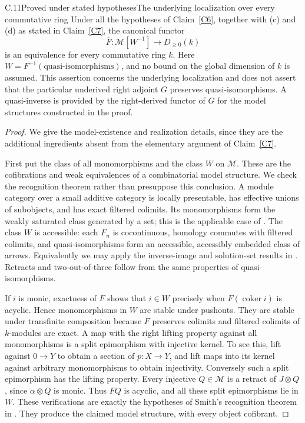 \begin{claim}{C.11}{Proved under stated hypotheses}{The underlying localization over every commutative ring}\label{C11}
Under all the hypotheses of Claim~\ref{C6}, together with (c) and (d) as stated in Claim~\ref{C7}, the canonical functor
\[
 \overline F:\mathcal M[W^{-1}]\longrightarrow D_{\geq0}(k)
\]
is an equivalence for every commutative ring $k$. Here $W=F^{-1}(\text{quasi-isomorphisms})$, and no bound on the global dimension of $k$ is assumed. This assertion concerns the underlying localization and does not assert that the particular underived right adjoint $G$ preserves quasi-isomorphisms. A quasi-inverse is provided by the right-derived functor of $G$ for the model structures constructed in the proof.
\end{claim}
\begin{proof}
We give the model-existence and realization details, since they are the additional ingredients absent from the elementary argument of Claim~\ref{C7}.

First put the class of all monomorphisms and the class $W$ on $\mathcal M$. These are the cofibrations and weak equivalences of a combinatorial model structure. We check the recognition theorem rather than presuppose this conclusion. A module category over a small additive category is locally presentable, has effective unions of subobjects, and has exact filtered colimits. Its monomorphisms form the weakly saturated class generated by a set; this is the applicable case of \citet[Proposition 1.12]{Beke2000}. The class $W$ is accessible: each $F_n$ is cocontinuous, homology commutes with filtered colimits, and quasi-isomorphisms form an accessible, accessibly embedded class of arrows. Equivalently we may apply the inverse-image and solution-set results in \citet[Propositions 1.15 and 1.18]{Beke2000}. Retracts and two-out-of-three follow from the same properties of quasi-isomorphisms.

If $i$ is monic, exactness of $F$ shows that $i\in W$ precisely when $F(\operatorname{coker}i)$ is acyclic. Hence monomorphisms in $W$ are stable under pushouts. They are stable under transfinite composition because $F$ preserves colimits and filtered colimits of $k$-modules are exact. A map with the right lifting property against all monomorphisms is a split epimorphism with injective kernel. To see this, lift against $0\to Y$ to obtain a section of $p:X\to Y$, and lift maps into its kernel against arbitrary monomorphisms to obtain injectivity. Conversely such a split epimorphism has the lifting property. Every injective $Q\in\mathcal M$ is a retract of $J\otimes Q$, since $\alpha\otimes Q$ is monic. Thus $FQ$ is acyclic, and all these split epimorphisms lie in $W$. These verifications are exactly the hypotheses of Smith's recognition theorem in \citet[Theorem 1.7]{Beke2000}. They produce the claimed model structure, with every object cofibrant.


\end{proof}
